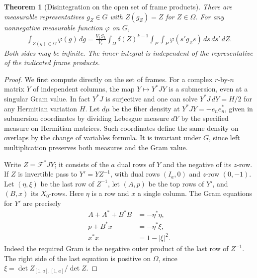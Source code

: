 \documentclass[a4paper,11pt]{article}
\newtheorem{theorem}[proposition]{Theorem}
\theoremstyle{definition}
\theoremstyle{remark}
\numberwithin{equation}{section}
\begin{document}
\begin{theorem}[Disintegration on the open set of frame products]
\leavevmode\label{thm:realgram682}
There are measurable representatives \(g_Z\in G\) with
\(Z(g_Z)=Z\) for \(Z\in\Omega\). For any nonnegative measurable
function \(\varphi\) on \(G\),
\[
 \begin{split}
 \int_{Z(g)\in\Omega}\varphi(g)\,dg
  =\frac{V_k S_k}{V_r}\int_\Omega \delta(Z)^{k-1}
    \int_P\int_P \varphi(s' g_Z s)\,ds\,ds'\,dZ .
 \end{split}
\]
Both sides may be infinite. The inner integral is independent
of the representative of the indicated frame products.
\end{theorem}
\begin{proof}
We first compute directly on the set of frames. For a complex
\(r\)-by-\(n\) matrix \(Y\) of independent columns, the map
\(Y\mapsto Y^*JY\) is a submersion, even at a singular Gram
value. In fact \(Y^*J\) is surjective and one can solve
\(Y^*J\,dY=H/2\) for any Hermitian variation \(H\). Let \(d\mu\)
be the fiber density at \(Y^*JY=-e_n e_n^*\), given in
submersion coordinates by dividing Lebesgue measure \(dY\) by
the specified measure on Hermitian matrices. Such coordinates
define the same density on overlaps by the change of variables
formula. It is invariant under \(G\), since left multiplication
preserves both measures and the Gram value.

Write \(Z=\mathcal F^*JY\); it consists of the \(a\) dual rows
of \(Y\) and the negative of its \(z\)-row. If \(Z\) is invertible
pass to \(Y'=YZ^{-1}\), with dual rows \((I_a,0)\) and \(z\)-row
\((0,-1)\). Let \((\eta,\xi)\) be the last row of \(Z^{-1}\),
let \((A,p)\) be the top rows of \(Y'\), and \((B,x)\) its
\(X_0\)-rows. Here \(\eta\) is a row and \(x\) a single column.
The Gram equations for \(Y'\) are precisely
\[
 \begin{split}
 A+A^*+B^*B&=-\eta^*\eta,\\
 p+B^*x&=-\eta^*\xi,\\
 x^*x&=1-|\xi|^2 .
 \end{split}
\]
Indeed the required Gram is the negative outer product of the
last row of \(Z^{-1}\). The right side of the last equation is
positive on \(\Omega\), since \(\xi=\det Z_{[1,a],[1,a]}/\det Z\).


\end{proof}
\end{document}
